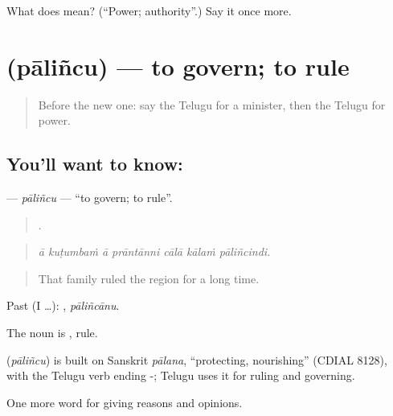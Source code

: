 \begin{tcolorbox}[breakable,colback=teal!4,colframe=teal!35!black,title={Before you move on}]
What does  mean? (\textquotedblleft{}Power; authority\textquotedblright{}.) Say it once more.
\end{tcolorbox}
\section[\texorpdfstring{\te{పాలించు} (pāliñcu)}{పాలించు (pāliñcu)}]{ (pāliñcu) — to govern; to rule}

\label{lesson:TE-C402-palincu}



\begin{quote}
Before the new one: say the Telugu for a minister, then the Telugu for power.
\end{quote}

\subsection*{You'll want to know: }
\textbf{} — \emph{pāliñcu} — \textquotedblleft{}to govern; to rule\textquotedblright{}.

\begin{quote}
      .
\end{quote}

\begin{quote}
\emph{ā kuṭumbaṁ ā prāntānni cālā kālaṁ pāliñcindi.}
\end{quote}

\begin{quote}
That family ruled the region for a long time.
\end{quote}

Past (I …): , \emph{pāliñcānu}.

The noun is , rule.

\begin{cousinweb}
\textbf{} (\emph{pāliñcu}) is built on Sanskrit \emph{pālana}, \textquotedblleft{}protecting, nourishing\textquotedblright{} (CDIAL 8128), with the Telugu verb ending -; Telugu uses it for ruling and governing.
\end{cousinweb}

\begin{grammarlens}[title={What you've built}]
One more word for giving reasons and opinions.
\end{grammarlens}

